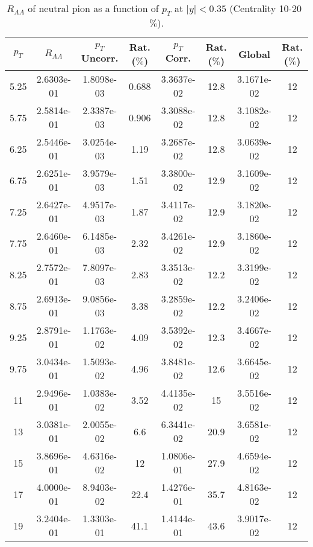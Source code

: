             
\begin{table}[!htb]
\centering
\begin{tabular}{|c|c|c|c|c|c|c|c|}
\hline
$p_{T}$ & $R_{AA}$ & $p_{T}$ Uncorr. & Rat. ($\%$) & $p_{T}$ Corr. & Rat. ($\%$) & Global & Rat. ($\%$)\\
\hline
5.25 & 2.6303e-01 & 1.8098e-03 & 0.688 & 3.3637e-02 & 12.8 & 3.1671e-02 & 12 \\ 
5.75 & 2.5814e-01 & 2.3387e-03 & 0.906 & 3.3088e-02 & 12.8 & 3.1082e-02 & 12 \\ 
6.25 & 2.5446e-01 & 3.0254e-03 & 1.19 & 3.2687e-02 & 12.8 & 3.0639e-02 & 12 \\ 
6.75 & 2.6251e-01 & 3.9579e-03 & 1.51 & 3.3800e-02 & 12.9 & 3.1609e-02 & 12 \\ 
7.25 & 2.6427e-01 & 4.9517e-03 & 1.87 & 3.4117e-02 & 12.9 & 3.1820e-02 & 12 \\ 
7.75 & 2.6460e-01 & 6.1485e-03 & 2.32 & 3.4261e-02 & 12.9 & 3.1860e-02 & 12 \\ 
8.25 & 2.7572e-01 & 7.8097e-03 & 2.83 & 3.3513e-02 & 12.2 & 3.3199e-02 & 12 \\ 
8.75 & 2.6913e-01 & 9.0856e-03 & 3.38 & 3.2859e-02 & 12.2 & 3.2406e-02 & 12 \\ 
9.25 & 2.8791e-01 & 1.1763e-02 & 4.09 & 3.5392e-02 & 12.3 & 3.4667e-02 & 12 \\ 
9.75 & 3.0434e-01 & 1.5093e-02 & 4.96 & 3.8481e-02 & 12.6 & 3.6645e-02 & 12 \\ 
11 & 2.9496e-01 & 1.0383e-02 & 3.52 & 4.4135e-02 & 15 & 3.5516e-02 & 12 \\ 
13 & 3.0381e-01 & 2.0055e-02 & 6.6 & 6.3441e-02 & 20.9 & 3.6581e-02 & 12 \\ 
15 & 3.8696e-01 & 4.6316e-02 & 12 & 1.0806e-01 & 27.9 & 4.6594e-02 & 12 \\ 
17 & 4.0000e-01 & 8.9403e-02 & 22.4 & 1.4276e-01 & 35.7 & 4.8163e-02 & 12 \\ 
19 & 3.2404e-01 & 1.3303e-01 & 41.1 & 1.4144e-01 & 43.6 & 3.9017e-02 & 12 \\ 
\hline
\end{tabular}
\caption{$R_{AA}$ of neutral pion as a function of $p_{T}$ at $|y|<0.35$ (Centrality 10-20~$\%$).}
\end{table}
            
